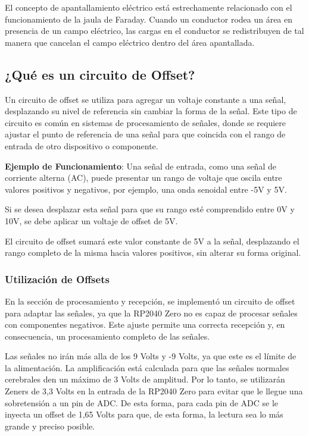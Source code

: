 \documentclass{article}
\begin{document}
El concepto de apantallamiento eléctrico está estrechamente relacionado con el funcionamiento de la jaula de Faraday. Cuando un conductor rodea un área en presencia de un campo eléctrico, las cargas en el conductor se redistribuyen de tal manera que cancelan el campo eléctrico dentro del área apantallada.

\subsection{¿Qué es un circuito de Offset?}

Un circuito de offset se utiliza para agregar un voltaje constante a una señal, desplazando su nivel de referencia sin cambiar la forma de la señal. Este tipo de circuito es común en sistemas de procesamiento de señales, donde se requiere ajustar el punto de referencia de una señal para que coincida con el rango de entrada de otro dispositivo o componente.

\textbf{Ejemplo de Funcionamiento}: Una señal de entrada, como una señal de corriente alterna (AC), puede presentar un rango de voltaje que oscila entre valores positivos y negativos, por ejemplo, una onda senoidal entre -5V y 5V.

Si se desea desplazar esta señal para que su rango esté comprendido entre 0V y 10V, se debe aplicar un voltaje de offset de 5V.

El circuito de offset sumará este valor constante de 5V a la señal, desplazando el rango completo de la misma hacia valores positivos, sin alterar su forma original.

\subsubsection{Utilización de Offsets}

En la sección de procesamiento y recepción, se implementó un circuito de offset para adaptar las señales, ya que la RP2040 Zero no es capaz de procesar señales con componentes negativos. Este ajuste permite una correcta recepción y, en consecuencia, un procesamiento completo de las señales. 

Las señales no irán más alla de los 9 Volts y -9 Volts, ya que este es el límite de la alimentación. La amplificación está calculada para que las señales normales cerebrales den un máximo de 3 Volts de amplitud. Por lo tanto, se utilizarán Zeners de 3,3 Volts en la entrada de la RP2040 Zero para evitar que le llegue una sobretensión a un pin de ADC. De esta forma, para cada pin de ADC se le inyecta un offset de 1,65 Volts para que, de esta forma, la lectura sea lo más grande y preciso posible.
\end{document}
